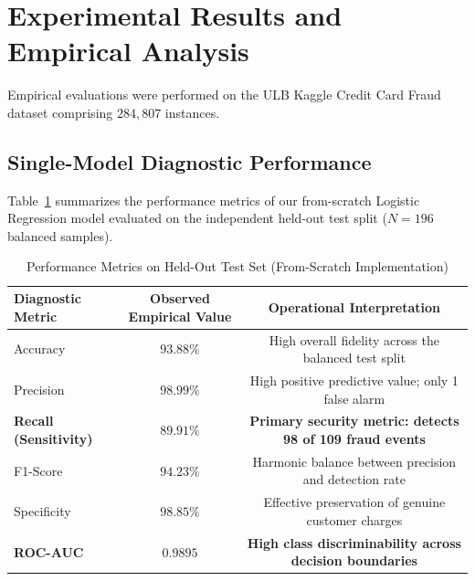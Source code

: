 \documentclass[11pt,a4paper]{article}
\begin{document}
\section{Experimental Results and Empirical Analysis}
\label{sec:results}

Empirical evaluations were performed on the ULB Kaggle Credit Card Fraud dataset comprising $284,807$ instances. 

\subsection{Single-Model Diagnostic Performance}
Table~\ref{tab:results} summarizes the performance metrics of our from-scratch Logistic Regression model evaluated on the independent held-out test split ($N = 196$ balanced samples).

\begin{table}[H]
    \centering
    \caption{Performance Metrics on Held-Out Test Set (From-Scratch Implementation)}
    \label{tab:results}
    \begin{tabular}{lcc}
        \toprule
        \textbf{Diagnostic Metric} & \textbf{Observed Empirical Value} & \textbf{Operational Interpretation} \\
        \midrule
        Accuracy & $93.88\%$ & High overall fidelity across the balanced test split \\
        Precision & $98.99\%$ & High positive predictive value; only 1 false alarm \\
        \textbf{Recall (Sensitivity)} & $\mathbf{89.91\%}$ & \textbf{Primary security metric: detects 98 of 109 fraud events} \\
        F1-Score & $94.23\%$ & Harmonic balance between precision and detection rate \\
        Specificity & $98.85\%$ & Effective preservation of genuine customer charges \\
        \textbf{ROC-AUC} & $\mathbf{0.9895}$ & \textbf{High class discriminability across decision boundaries} \\
        \bottomrule
    \end{tabular}
\end{table}
\end{document}

